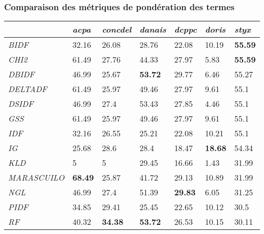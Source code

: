 \subsubsection{Comparaison des métriques de pondération des termes}
\begin{table}[]
	\begin{tabular}{|l|l|l|l|l|l|l|}
		\hline
		& \textit{acpa}  & \textit{concdel} & \textit{danais} & \textit{dcppc} & \textit{doris} & \textit{styx}  \\ \hline
		\textit{BIDF}       & 32.16          & 26.08            & 28.76           & 22.08          & 10.19          & \textbf{55.59} \\ \hline
		\textit{CHI2}       & 61.49          & 27.76            & 44.33           & 27.97          & 5.83           & \textbf{55.59} \\ \hline
		\textit{DBIDF}      & 46.99          & 25.67            & \textbf{53.72}  & 29.77          & 6.46           & 55.27          \\ \hline
		\textit{DELTADF}    & 61.49          & 25.97            & 49.46           & 27.97          & 9.61           & 55.1           \\ \hline
		\textit{DSIDF}      & 46.99          & 27.4             & 53.43           & 27.85          & 4.46           & 55.1           \\ \hline
		\textit{GSS}        & 61.49          & 25.97            & 49.46           & 27.97          & 9.61           & 55.1           \\ \hline
		\textit{IDF}        & 32.16          & 26.55            & 25.21           & 22.08          & 10.21          & 55.1           \\ \hline
		\textit{IG}         & 25.68          & 28.6             & 28.4            & 18.47          & \textbf{18.68} & 54.34          \\ \hline
		\textit{KLD}        & 5              & 5                & 29.45           & 16.66          & 1.43           & 31.99          \\ \hline
		\textit{MARASCUILO} & \textbf{68.49} & 25.87            & 41.72           & 29.13          & 10.89          & 31.99          \\ \hline
		\textit{NGL}        & 46.99          & 27.4             & 51.39           & \textbf{29.83} & 6.05           & 31.25          \\ \hline
		\textit{PIDF}       & 34.85          & 29.41            & 25.45           & 22.65          & 10.12          & 30.5           \\ \hline
		\textit{RF}         & 40.32          & \textbf{34.38}   & \textbf{53.72}  & 26.53          & 10.15          & 30.11          \\ \hline
	\end{tabular}
\end{table}
